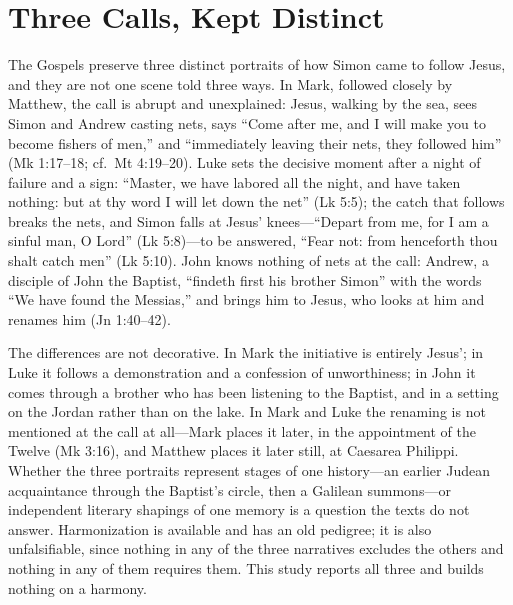 \section{Three Calls, Kept Distinct}

The Gospels preserve three distinct portraits of how Simon came to follow
Jesus, and they are not one scene told three ways. In Mark, followed closely
by Matthew, the call is abrupt and unexplained: Jesus, walking by the sea,
sees Simon and Andrew casting nets, says ``Come after me, and I will make
you to become fishers of men,'' and ``immediately leaving their nets, they
followed him'' (Mk 1:17--18; cf.\ Mt 4:19--20). Luke sets the decisive moment
after a night of failure and a sign: ``Master, we have labored all the
night, and have taken nothing: but at thy word I will let down the net''
(Lk 5:5); the catch that follows breaks the nets, and Simon falls at Jesus'
knees---``Depart from me, for I am a sinful man, O Lord'' (Lk 5:8)---to be
answered, ``Fear not: from henceforth thou shalt catch men'' (Lk 5:10). John
knows nothing of nets at the call: Andrew, a disciple of John the Baptist,
``findeth first his brother Simon'' with the words ``We have found the
Messias,'' and brings him to Jesus, who looks at him and renames him
(Jn 1:40--42).

The differences are not decorative. In Mark the initiative is entirely
Jesus'; in Luke it follows a demonstration and a confession of unworthiness;
in John it comes through a brother who has been listening to the Baptist, and
in a setting on the Jordan rather than on the lake. In Mark and Luke the
renaming is not mentioned at the call at all---Mark places it later, in the
appointment of the Twelve (Mk 3:16), and Matthew places it later still, at
Caesarea Philippi. Whether the three portraits represent stages of one
history---an earlier Judean acquaintance through the Baptist's circle, then a
Galilean summons---or independent literary shapings of one memory is a
question the texts do not answer. Harmonization is available and has an old
pedigree; it is also unfalsifiable, since nothing in any of the three
narratives excludes the others and nothing in any of them requires them. This
study reports all three and builds nothing on a harmony.

